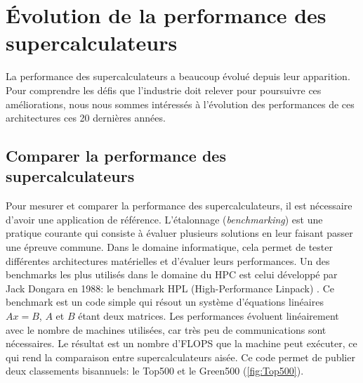 \section{Évolution de la performance des supercalculateurs}\label{sec:edl_evolution}

La performance des supercalculateurs a beaucoup évolué depuis leur apparition. Pour comprendre les défis que l'industrie doit relever pour poursuivre ces améliorations, nous nous sommes intéressés à l'évolution des performances de ces architectures ces 20 dernières années.


\subsection{Comparer la performance des supercalculateurs}

    Pour mesurer et comparer la performance des supercalculateurs, il est nécessaire d'avoir une application de référence. L'étalonnage (\textit{benchmarking}) est une pratique courante qui consiste à évaluer plusieurs solutions en leur faisant passer une épreuve commune. Dans le domaine informatique, cela permet de tester différentes architectures matérielles et d'évaluer leurs performances. Un des benchmarks les plus utilisés dans le domaine du HPC est celui développé par Jack Dongara en 1988: le benchmark HPL (High-Performance Linpack) \cite{Dongarra2003}. Ce benchmark est un code simple qui résout un système d'équations linéaires $Ax = B$, $A$ et $B$ étant deux matrices. Les performances évoluent linéairement avec le nombre de machines utilisées, car très peu de communications sont nécessaires. Le résultat est un nombre d'\gls{FLOPS} que la machine peut exécuter, ce qui rend la comparaison entre supercalculateurs aisée.
    Ce code permet de publier deux classements bisannuels: le Top500 et le Green500 (\autoref{fig:Top500}).


